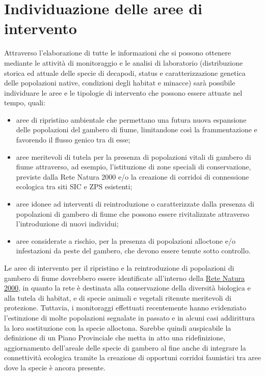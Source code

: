 \documentclass[10pt,twoside,openany,x11names,svgnames,italian,a5paper,dvipsnames,table]{memoir}
\begin{document}
\section{Individuazione delle aree di intervento}
Attraverso l’elaborazione di tutte le informazioni che si possono ottenere mediante le attività di monitoraggio e le analisi di laboratorio (distribuzione storica ed attuale delle specie di decapodi, status e caratterizzazione genetica delle popolazioni native, condizioni degli habitat e minacce) sarà possibile individuare le aree e le tipologie di intervento che possono essere attuate nel tempo, quali:
\begin{itemize}\itemsep0pt
  \item aree di ripristino ambientale che permettano una futura nuova espansione delle popolazioni del gambero di fiume, limitandone così la frammentazione e favorendo il flusso genico tra di esse;
  \item aree meritevoli di tutela per la presenza di popolazioni vitali di gambero di fiume attraverso, ad esempio, l’istituzione di zone speciali di conservazione, previste dalla Rete Natura 2000 e/o la creazione di corridoi di connessione ecologica tra siti SIC e ZPS esistenti; 
  \item aree idonee ad interventi di reintroduzione o caratterizzate dalla presenza di popolazioni di gambero di fiume che possono essere rivitalizzate attraverso l’introduzione di nuovi individui;
  \item aree considerate a rischio, per la presenza di popolazioni alloctone e/o infestazioni da peste del gambero, che devono essere tenute sotto controllo.
\end{itemize}

Le aree di intervento per il ripristino e la reintroduzione di popolazioni di gambero di fiume dovrebbero essere identificate all’interno della \href{http://www.comune.trento.it/Aree-tematiche/Ambiente-e-territorio/Tutela-degli-ecosistemi-naturali/Rete-Natura-2000}{Rete Natura 2000}, in quanto la rete è destinata alla conservazione della diversità biologica e alla tutela di habitat, e di specie animali e vegetali ritenute meritevoli di protezione. Tuttavia, i monitoraggi effettuati recentemente hanno evidenziato l'estinzione di molte popolazioni segnalate in passato e in alcuni casi addirittura la loro sostituzione con la specie alloctona.
Sarebbe quindi auspicabile la definizione di un Piano Provinciale che metta in atto una ridefinizione, aggiornamento dell'areale delle specie di gambero al fine anche di integrare la connettività ecologica tramite la creazione di opportuni corridoi faunistici tra aree dove la specie è ancora presente.
\end{document}
